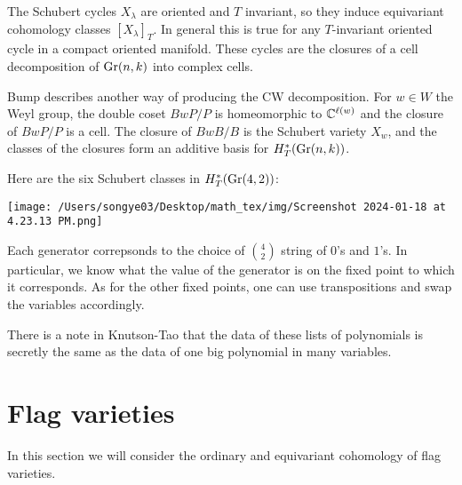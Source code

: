\documentclass[12pt]{article}
\begin{document}
\hfill

The Schubert cycles $X_\lambda$ are oriented and $T$ invariant, so they induce equivariant cohomology classes $[X_\lambda]_T$.
In general this is true for any $T$-invariant oriented cycle in a compact oriented manifold. 
These cycles are the closures of a cell decomposition of $\operatorname{Gr}(n,k)$ into complex cells.

\hfill

Bump describes another way of producing the CW decomposition. For $w\in W$ the Weyl group, the double coset $BwP/P$ is homeomorphic 
to $\mathbb{C}^{\ell(w)}$ and the closure of $BwP/P$ is a cell. The closure of $BwB/B$ is the Schubert variety $X_w$, and the classes of 
the closures form an additive basis for $H^*_T(\operatorname{Gr}(n,k))$.

\hfill

Here are the six Schubert classes in $H^*_T(\operatorname{Gr}(4,2))$:
\begin{center}
    \texttt{[image: /Users/songye03/Desktop/math\_tex/img/Screenshot 2024-01-18 at 4.23.13 PM.png]}
\end{center}

Each generator correpsonds to the choice of $\binom{4}{2}$ string of $0$'s and $1$'s. In particular, we know what the value of the generator is on the fixed point 
to which it corresponds. As for the other fixed points, one can use transpositions and swap the variables accordingly. 

\begin{remark}
    There is a note in Knutson-Tao that the data of these lists of polynomials is secretly the same as the data of one big polynomial in many variables.
\end{remark}
\section{Flag varieties}
In this section we will consider the ordinary and equivariant cohomology of flag varieties.

\hfill
\end{document}
